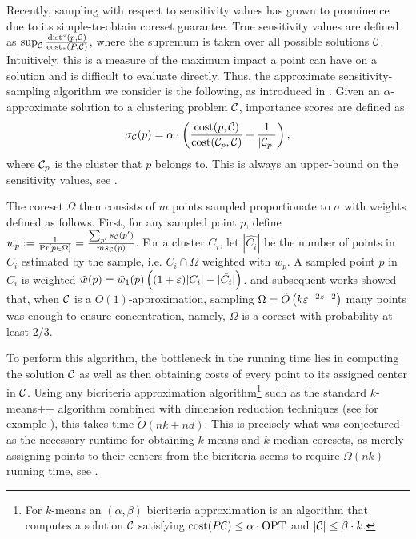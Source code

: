 Recently, sampling with respect to sensitivity values has grown to prominence due to its simple-to-obtain coreset guarantee.  True sensitivity values are defined
as $\sup_{\mathcal C} \frac{\operatorname{dist}^z(p, \mathcal C)}{\operatorname{cost}_z(P, \mathcal C)}$, where the supremum is taken over all possible solutions $\mathcal C$. Intuitively, this is a measure
of the maximum impact a point can have on a solution and is difficult to evaluate directly.
Thus, the approximate sensitivity-sampling algorithm we consider is the following, as introduced in \cite{FL11}.
Given an $\alpha$-approximate solution to a clustering problem $\mathcal C$, importance scores are defined as
\begin{equation}
\label{eq:sensitivity}
\sigma_\mathcal C(p) = \alpha \cdot \left( \dfrac{\operatorname{cost}(p, \mathcal C)}{\operatorname{cost}(\mathcal C_{p}, \mathcal C)} + \dfrac{1}{|\mathcal C_p|} \right),
\end{equation}
where $\mathcal C_p$ is the cluster that $p$ belongs to. This is always an upper-bound on the sensitivity values, see \cite{FL11}.

The coreset $\Omega$ then consists of $m$ points sampled proportionate to $\sigma$ with weights defined as follows. First, for any sampled point $p$, define $w_p :=
\frac{1}{\Pr[p \in \Omega]} = \frac{\sum_{p'} s_\mathcal C(p')}{m s_\mathcal C(p)}$. For a cluster $C_i$, let $|\hat{C_i}|$ be the number of points in $C_i$ estimated by the
sample, i.e. $C_i \cap \Omega$ weighted with $w_p$. A sampled point $p$ in $C_i$ is
weighted $\tilde w(p) = \tilde w_1(p) \left( (1+\varepsilon)|C_i| - |\hat{C_i}|\right)$.  \cite{HuangV20} and subsequent works showed that, when $\mathcal C$ is
a $O(1)$-approximation, sampling $\Omega = \tilde O\left( k \varepsilon^{-2z-2}\right)$ many points was enough to ensure concentration, namely, $\Omega$ is a coreset with
probability at least $2/3$.

To perform this algorithm, the bottleneck in the running time lies in computing the solution $\mathcal C$ as well as then obtaining costs of every point to its
assigned center in $\mathcal C$. Using any bicriteria approximation algorithm\footnote{For $k$-means an $(\alpha,\beta)$ bicriteria approximation is an algorithm
that computes a solution $\mathcal C$ satisfying $\operatorname{cost}(P\mathcal C)\leq \alpha\cdot \text{OPT}$ and $|\mathcal C|\leq \beta\cdot k$.} such as the standard $k$-means++ algorithm
\cite{ArV07} combined with dimension reduction techniques (see for example \cite{BecchettiBC0S19,CohenEMMP15,MakarychevMR19}), this takes time $\tilde O(nk
+nd)$. This is precisely what was conjectured as the necessary runtime for obtaining $k$-means and $k$-median coresets, as merely assigning points to their
centers from the bicriteria seems to require $\Omega(nk)$ running time, see \cite{DSWY22}. 


